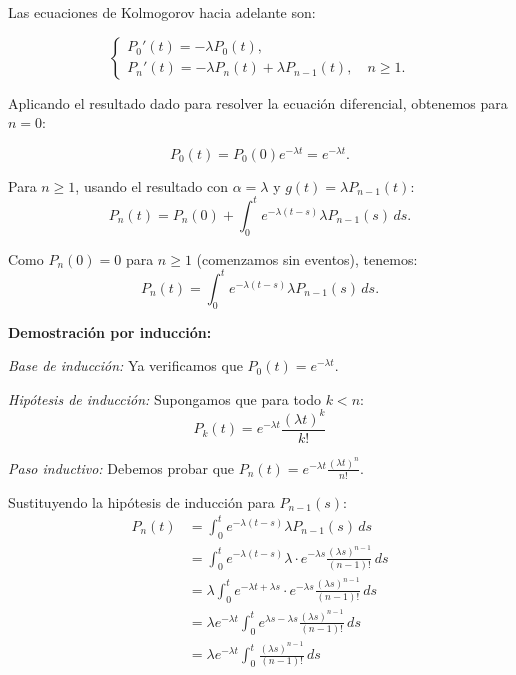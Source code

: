 \documentclass[10pt]{article}
\begin{document}
Las ecuaciones de Kolmogorov hacia adelante son:

\begin{equation*}
\begin{cases}
P_0'(t) = -\lambda P_0(t), \\
P_n'(t) = -\lambda P_n(t) + \lambda P_{n-1}(t), \quad n \geq 1.
\end{cases}
\end{equation*}

Aplicando el resultado dado para resolver la ecuación diferencial, obtenemos para $n=0$:

\begin{equation*}
P_0(t) = P_0(0) e^{-\lambda t} = e^{-\lambda t}.
\end{equation*}

Para $n \geq 1$, usando el resultado con $\alpha = \lambda$ y $g(t) = \lambda P_{n-1}(t)$:
\begin{equation*}
P_n(t) = P_n(0) + \int_0^t e^{-\lambda(t-s)} \lambda P_{n-1}(s) \, ds.
\end{equation*}

Como $P_n(0) = 0$ para $n \geq 1$ (comenzamos sin eventos), tenemos:
\begin{equation*}
P_n(t) = \int_0^t e^{-\lambda(t-s)} \lambda P_{n-1}(s) \, ds.
\end{equation*}

\textbf{Demostración por inducción:}

\textit{Base de inducción:} Ya verificamos que $P_0(t) = e^{-\lambda t}$.

\textit{Hipótesis de inducción:} Supongamos que para todo $k < n$:
\begin{equation*}
P_k(t) = e^{-\lambda t} \frac{(\lambda t)^k}{k!}
\end{equation*}

\textit{Paso inductivo:} Debemos probar que $P_n(t) = e^{-\lambda t} \frac{(\lambda t)^n}{n!}$.

Sustituyendo la hipótesis de inducción para $P_{n-1}(s)$:
\begin{align*}
P_n(t) &= \int_0^t e^{-\lambda(t-s)} \lambda P_{n-1}(s) \, ds \\
&= \int_0^t e^{-\lambda(t-s)} \lambda \cdot e^{-\lambda s} \frac{(\lambda s)^{n-1}}{(n-1)!} \, ds \\
&= \lambda \int_0^t e^{-\lambda t + \lambda s} \cdot e^{-\lambda s} \frac{(\lambda s)^{n-1}}{(n-1)!} \, ds \\
&= \lambda e^{-\lambda t} \int_0^t e^{\lambda s - \lambda s} \frac{(\lambda s)^{n-1}}{(n-1)!} \, ds \\
&= \lambda e^{-\lambda t} \int_0^t \frac{(\lambda s)^{n-1}}{(n-1)!} \, ds
\end{align*}
\end{document}
